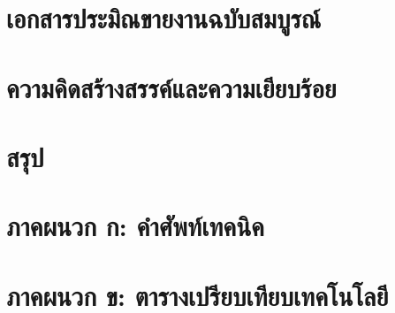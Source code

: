\documentclass[a4paper]{article}
\begin{document}
\section{เอกสารประมิณขายงานฉบับสมบูรณ์}

\section{ความคิดสร้างสรรค์และความเยียบร้อย}

\section{สรุป}

\printbibliography[title=เอกสารอ้างอิง]

\appendix

\section{ภาคผนวก ก: คำศัพท์เทคนิค}

\section{ภาคผนวก ข: ตารางเปรียบเทียบเทคโนโลยี}
\end{document}
